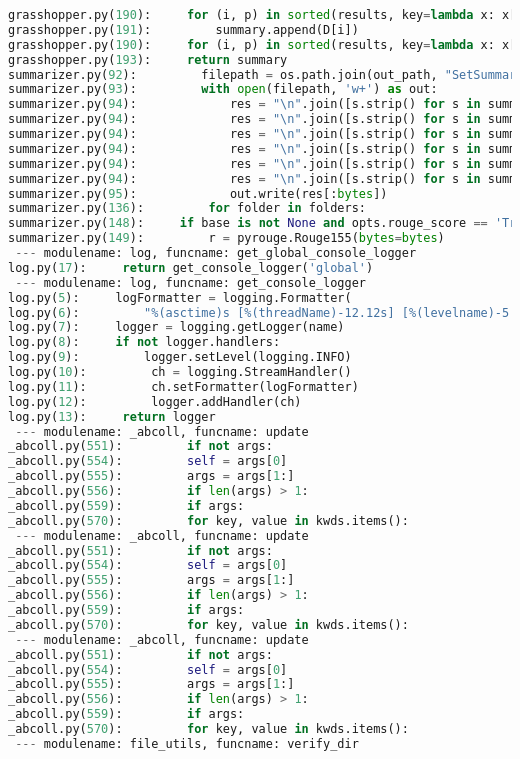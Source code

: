 \documentclass[11pt]{article}
\begin{document}
\begin{lstlisting}[language=Python]
grasshopper.py(190):     for (i, p) in sorted(results, key=lambda x: x[0]):
grasshopper.py(191):         summary.append(D[i])
grasshopper.py(190):     for (i, p) in sorted(results, key=lambda x: x[0]):
grasshopper.py(193):     return summary
summarizer.py(92):         filepath = os.path.join(out_path, "SetSummary.{}.txt".format(setID))
summarizer.py(93):         with open(filepath, 'w+') as out:
summarizer.py(94):             res = "\n".join([s.strip() for s in summary])
summarizer.py(94):             res = "\n".join([s.strip() for s in summary])
summarizer.py(94):             res = "\n".join([s.strip() for s in summary])
summarizer.py(94):             res = "\n".join([s.strip() for s in summary])
summarizer.py(94):             res = "\n".join([s.strip() for s in summary])
summarizer.py(94):             res = "\n".join([s.strip() for s in summary])
summarizer.py(95):             out.write(res[:bytes])
summarizer.py(136):         for folder in folders:
summarizer.py(148):     if base is not None and opts.rouge_score == 'True':
summarizer.py(149):         r = pyrouge.Rouge155(bytes=bytes)
 --- modulename: log, funcname: get_global_console_logger
log.py(17):     return get_console_logger('global')
 --- modulename: log, funcname: get_console_logger
log.py(5):     logFormatter = logging.Formatter(
log.py(6):         "%(asctime)s [%(threadName)-12.12s] [%(levelname)-5.5s]  %(message)s")
log.py(7):     logger = logging.getLogger(name)
log.py(8):     if not logger.handlers:
log.py(9):         logger.setLevel(logging.INFO)
log.py(10):         ch = logging.StreamHandler()
log.py(11):         ch.setFormatter(logFormatter)
log.py(12):         logger.addHandler(ch)
log.py(13):     return logger
 --- modulename: _abcoll, funcname: update
_abcoll.py(551):         if not args:
_abcoll.py(554):         self = args[0]
_abcoll.py(555):         args = args[1:]
_abcoll.py(556):         if len(args) > 1:
_abcoll.py(559):         if args:
_abcoll.py(570):         for key, value in kwds.items():
 --- modulename: _abcoll, funcname: update
_abcoll.py(551):         if not args:
_abcoll.py(554):         self = args[0]
_abcoll.py(555):         args = args[1:]
_abcoll.py(556):         if len(args) > 1:
_abcoll.py(559):         if args:
_abcoll.py(570):         for key, value in kwds.items():
 --- modulename: _abcoll, funcname: update
_abcoll.py(551):         if not args:
_abcoll.py(554):         self = args[0]
_abcoll.py(555):         args = args[1:]
_abcoll.py(556):         if len(args) > 1:
_abcoll.py(559):         if args:
_abcoll.py(570):         for key, value in kwds.items():
 --- modulename: file_utils, funcname: verify_dir

\end{lstlisting}
\end{document}
